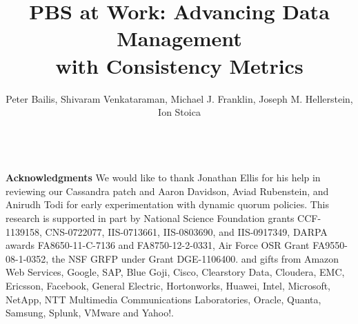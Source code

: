\documentclass{sig-alternate}
\begin{document}
\title{PBS at Work: Advancing Data Management\\with Consistency Metrics}

\author{Peter Bailis, Shivaram Venkataraman, Michael J. Franklin, Joseph M. Hellerstein, Ion Stoica\\
\\
}

\sloppy
{}

\maketitle










\vspace{1em}
\noindent\textbf{Acknowledgments} We would like to thank Jonathan
Ellis for his help in reviewing our Cassandra patch and Aaron
Davidson, Aviad Rubenstein, and Anirudh Todi for early experimentation
with dynamic quorum policies. This research is supported in part by
National Science Foundation grants CCF-1139158, CNS-0722077,
IIS-0713661, IIS-0803690, and IIS-0917349, DARPA awards
FA8650-11-C-7136 and FA8750-12-2-0331, Air Force OSR Grant
FA9550-08-1-0352, the NSF GRFP under Grant DGE-1106400. and gifts from
Amazon Web Services, Google, SAP, Blue Goji, Cisco, Clearstory Data,
Cloudera, EMC, Ericsson, Facebook, General Electric, Hortonworks,
Huawei, Intel, Microsoft, NetApp, NTT Multimedia Communications
Laboratories, Oracle, Quanta, Samsung, Splunk, VMware and Yahoo!.



\end{document}
